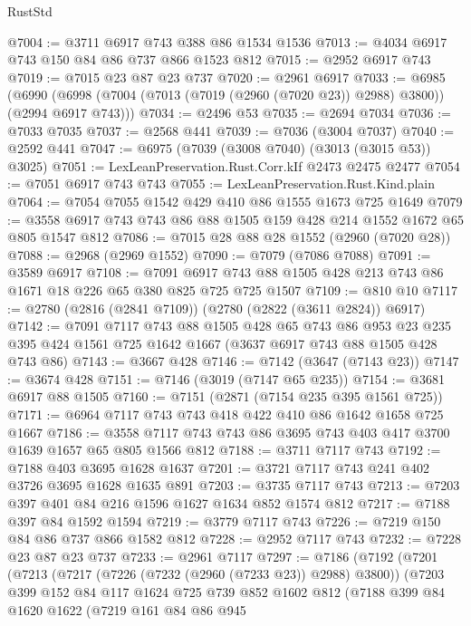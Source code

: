 \begin{lexlean}{RustStd}
\begin{coremodule}
@7004 := @3711 @6917 @743 @388 @86 @1534 @1536
@7013 := @4034 @6917 @743 @150 @84 @86 @737 @866 @1523 @812
@7015 := @2952 @6917 @743
@7019 := @7015 @23 @87 @23 @737
@7020 := @2961 @6917
@7033 := @6985
    (@6990 (@6998 (@7004 (@7013 (@7019 (@2960 (@7020 @23)) @2988) @3800)) (@2994 @6917 @743)))
@7034 := @2496 @53
@7035 := @2694 @7034
@7036 := @7033 @7035
@7037 := @2568 @441
@7039 := @7036 (@3004 @7037)
@7040 := @2592 @441
@7047 := @6975 (@7039 (@3008 @7040) (@3013 (@3015 @53)) @3025)
@7051 := LexLeanPreservation.Rust.Corr.kIf @2473 @2475 @2477
@7054 := @7051 @6917 @743 @743
@7055 := LexLeanPreservation.Rust.Kind.plain
@7064 := @7054 @7055 @1542 @429 @410 @86 @1555 @1673 @725 @1649
@7079 := @3558 @6917 @743 @743 @86 @88 @1505 @159 @428 @214 @1552 @1672 @65 @805 @1547 @812
@7086 := @7015 @28 @88 @28 @1552 (@2960 (@7020 @28))
@7088 := @2968 (@2969 @1552)
@7090 := @7079 (@7086 @7088)
@7091 := @3589 @6917
@7108 := @7091 @6917 @743 @88 @1505 @428 @213 @743 @86 @1671 @18 @226 @65 @380 @825 @725 @725 @1507
@7109 := @810 @10
@7117 := @2780 (@2816 (@2841 @7109)) (@2780 (@2822 (@3611 @2824)) @6917)
@7142 := @7091
    @7117
    @743
    @88
    @1505
    @428
    @65
    @743
    @86
    @953
    @23
    @235
    @395
    @424
    @1561
    @725
    @1642
    @1667
    (@3637 @6917 @743 @88 @1505 @428 @743 @86)
@7143 := @3667 @428
@7146 := @7142 (@3647 (@7143 @23))
@7147 := @3674 @428
@7151 := @7146 (@3019 (@7147 @65 @235))
@7154 := @3681 @6917 @88 @1505
@7160 := @7151 (@2871 (@7154 @235 @395 @1561 @725))
@7171 := @6964 @7117 @743 @743 @418 @422 @410 @86 @1642 @1658 @725 @1667
@7186 := @3558 @7117 @743 @743 @86 @3695 @743 @403 @417 @3700 @1639 @1657 @65 @805 @1566 @812
@7188 := @3711 @7117 @743
@7192 := @7188 @403 @3695 @1628 @1637
@7201 := @3721 @7117 @743 @241 @402 @3726 @3695 @1628 @1635 @891
@7203 := @3735 @7117 @743
@7213 := @7203 @397 @401 @84 @216 @1596 @1627 @1634 @852 @1574 @812
@7217 := @7188 @397 @84 @1592 @1594
@7219 := @3779 @7117 @743
@7226 := @7219 @150 @84 @86 @737 @866 @1582 @812
@7228 := @2952 @7117 @743
@7232 := @7228 @23 @87 @23 @737
@7233 := @2961 @7117
@7297 := @7186
    (@7192
      (@7201
        (@7213
          (@7217 (@7226 (@7232 (@2960 (@7233 @23)) @2988) @3800))
          (@7203
            @399
            @152
            @84
            @117
            @1624
            @725
            @739
            @852
            @1602
            @812
            (@7188
              @399
              @84
              @1620
              @1622
              (@7219
                @161
                @84
                @86
                @945

\end{coremodule}
\end{lexlean}
